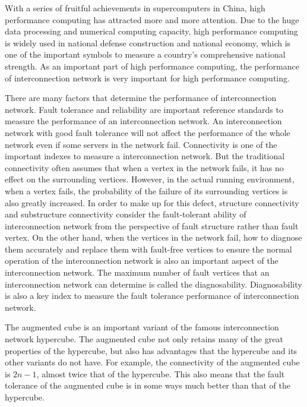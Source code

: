 \begin{englishabstract}

With a series of fruitful achievements in supercomputers in China, high performance computing has attracted more and more attention. Due to the huge data processing and numerical computing capacity, high performance computing is widely used in national defense construction and national economy, which is one of the important symbols to measure a country's comprehensive national strength. As an important part of high performance computing, the performance of interconnection network is very important for high performance computing.

There are many factors that determine the performance of interconnection network. Fault tolerance and reliability are important reference standards to measure the performance of an interconnection network. An interconnection network with good fault tolerance will not affect the performance of the whole network even if some servers in the network fail. Connectivity is one of the important indexes to measure a interconnection network. But the traditional connectivity often assumes that when a vertex in the network fails, it has no effect on the surrounding vertices. However, in the actual running environment, when a vertex fails, the probability of the failure of its surrounding vertices is also greatly increased. In order to make up for this defect, structure connectivity and substructure connectivity consider the fault-tolerant ability of interconnection network from the perspective of fault structure rather than fault vertex. On the other hand, when the vertices in the network fail, how to diagnose them accurately and replace them with fault-free vertices to ensure the normal operation of the interconnection network is also an important aspect of the interconnection network. The maximum number of fault vertices that an interconnection network can determine is called the diagnosability. Diagnosability is also a key index to measure the fault tolerance performance of interconnection network.


The augmented cube is an important variant of the famous interconnection network hypercube. The augmented cube not only retains many of the great properties of the hypercube, but also has advantages that the hypercube and its other variants do not have. For example, the connectivity of the augmented cube is $2n-1$, almost twice that of the hypercube. This also means that the fault tolerance of the augmented cube is in some ways much better than that of the hypercube.


\end{englishabstract}

